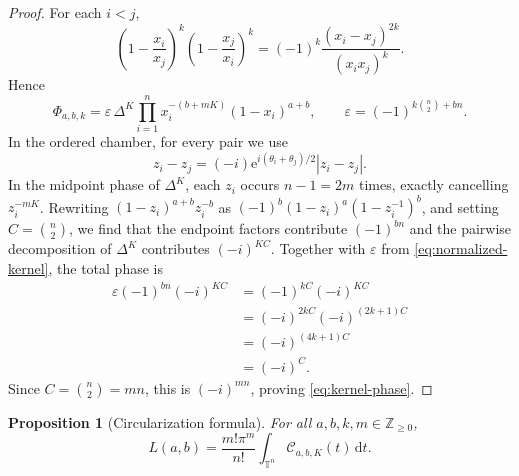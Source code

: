 \documentclass[11pt,a4paper]{article}
\newtheorem{proposition}[theorem]{Proposition}
\theoremstyle{definition}
\newcommand{\e}{\mathrm e}
\newcommand{\T}{\mathbb T}
\newcommand{\dd}{\,\mathrm d}
\begin{document}
\begin{proof}
For each $i<j$,
\[
\left(1-\frac{x_i}{x_j}\right)^k
\left(1-\frac{x_j}{x_i}\right)^k
=(-1)^k\frac{(x_i-x_j)^{2k}}{(x_ix_j)^k}.
\]
Hence
\begin{equation}\label{eq:normalized-kernel}
\Phi_{a,b,k}
=\varepsilon\,\Delta^K
\prod_{i=1}^{n}x_i^{-(b+mK)}(1-x_i)^{a+b},
\qquad
\varepsilon=(-1)^{k\binom n2+bn}.
\end{equation}
In the ordered chamber, for every pair we use
\[
 z_i-z_j=(-i)\e^{i(\theta_i+\theta_j)/2}|z_i-z_j|.
\]
In the midpoint phase of $\Delta^K$, each $z_i$ occurs
$n-1=2m$ times, exactly cancelling $z_i^{-mK}$. Rewriting
$(1-z_i)^{a+b}z_i^{-b}$ as
$(-1)^b(1-z_i)^a(1-z_i^{-1})^b$, and setting
$C=\binom n2$, we find that the endpoint factors contribute
$(-1)^{bn}$ and the pairwise decomposition of $\Delta^K$ contributes
$(-i)^{KC}$. Together with $\varepsilon$ from
\eqref{eq:normalized-kernel}, the total phase is
\[
\begin{aligned}
\varepsilon(-1)^{bn}(-i)^{KC}
 &=(-1)^{kC}(-i)^{KC}\\
 &=(-i)^{2kC}(-i)^{(2k+1)C}\\
 &=(-i)^{(4k+1)C}\\
 &=(-i)^C.
\end{aligned}
\]
Since $C=\binom n2=mn$, this is $(-i)^{mn}$, proving
\eqref{eq:kernel-phase}.
\end{proof}

\begin{proposition}[Circularization formula]\label{prop:circularization}
For all $a,b,k,m\in\mathbb Z_{\ge0}$,
\begin{equation}\label{eq:circularization}
 L(a,b)=\frac{m!\pi^m}{n!}
 \int_{\T^n}\mathcal C_{a,b,K}(t)\dd t.
\end{equation}
\end{proposition}
\end{document}

